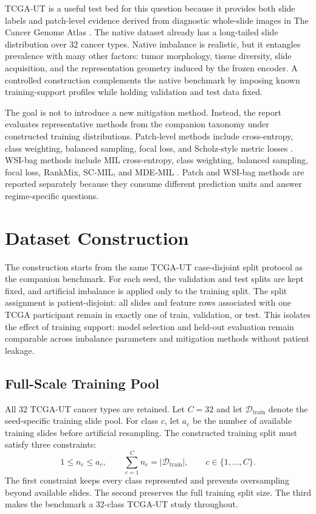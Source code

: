 \documentclass[11pt]{article}
\begin{document}
TCGA-UT is a useful test bed for this question because it provides both slide labels and patch-level evidence derived from diagnostic whole-slide images in The Cancer Genome Atlas \citep{tomczak2015reviewThe,komura2022universalEncoding}. The native dataset already has a long-tailed slide distribution over 32 cancer types. Native imbalance is realistic, but it entangles prevalence with many other factors: tumor morphology, tissue diversity, slide acquisition, and the representation geometry induced by the frozen encoder. A controlled construction complements the native benchmark by imposing known training-support profiles while holding validation and test data fixed.

The goal is not to introduce a new mitigation method. Instead, the report evaluates representative methods from the companion taxonomy under constructed training distributions. Patch-level methods include cross-entropy, class weighting, balanced sampling, focal loss, and Scholz-style metric losses \citep{scholz2024imbalanceAware}. WSI-bag methods include MIL cross-entropy, class weighting, balanced sampling, focal loss, RankMix, SC-MIL, and MDE-MIL \citep{chen2023rankmix,juyal2024scMil,ling2025mdeMil}. Patch and WSI-bag methods are reported separately because they consume different prediction units and answer regime-specific questions.

\section{Dataset Construction}
\label{sec:dataset-construction}
The construction starts from the same TCGA-UT case-disjoint split protocol as the companion benchmark. For each seed, the validation and test splits are kept fixed, and artificial imbalance is applied only to the training split. The split assignment is patient-disjoint: all slides and feature rows associated with one TCGA participant remain in exactly one of train, validation, or test. This isolates the effect of training support: model selection and held-out evaluation remain comparable across imbalance parameters and mitigation methods without patient leakage.

\subsection{Full-Scale Training Pool}
All 32 TCGA-UT cancer types are retained. Let $C=32$ and let $\mathcal{D}_{\mathrm{train}}$ denote the seed-specific training slide pool. For class $c$, let $a_c$ be the number of available training slides before artificial resampling. The constructed training split must satisfy three constraints:
\begin{equation}
  1 \le n_c \le a_c,\qquad
  \sum_{c=1}^{C} n_c = |\mathcal{D}_{\mathrm{train}}|,\qquad
  c \in \{1,\ldots,C\}.
  \label{eq:full-scale-constraints}
\end{equation}
\noindent The first constraint keeps every class represented and prevents oversampling beyond available slides. The second preserves the full training split size. The third makes the benchmark a 32-class TCGA-UT study throughout.
\end{document}
